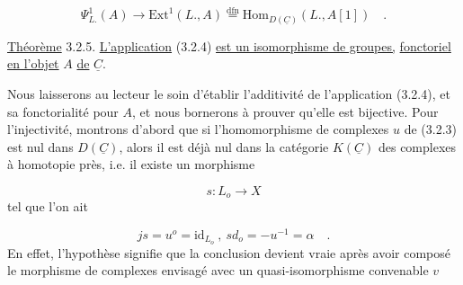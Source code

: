 \begin{equation}\tag{3.2.4}
\Psi^1_{L.} (A) \longrightarrow \mathrm{Ext}^1(L., A) \overset{\mathrm{dfn}}{=} \mathrm{Hom}_{D(\underline{C})}(L., A[1]) \quad .
\end{equation}


\underline{Théorème} 3.2.5. \underline{L'application} (3.2.4) \underline{est un isomorphisme de groupes,} \underline{fonctoriel en l'objet} $A$ \underline{de} $\underline{C}$.

Nous laisserons au lecteur le soin d'établir l'additivité de l'application (3.2.4), et sa fonctorialité pour $A$, et nous bornerons à prouver qu'elle est bijective. Pour l'injectivité, montrons d'abord que si l'homomorphisme de complexes $u$ de (3.2.3) est nul dans $D(\underline{C})$, alors il est déjà nul dans la catégorie $K(\underline{C})$ des complexes à homotopie près, i.e. il existe un morphisme

\begin{equation*}
s : L_o \longrightarrow X
\end{equation*}
tel que l'on ait

\begin{equation}\tag{3.2.5.1}
js = u^o = \mathrm{id}_{L_o} \ , \ sd_o = - u^{-1} = \alpha \quad .
\end{equation}
En effet, l'hypothèse signifie que la conclusion devient vraie après avoir composé le morphisme de complexes envisagé avec un quasi-isomorphisme convenable $v$

